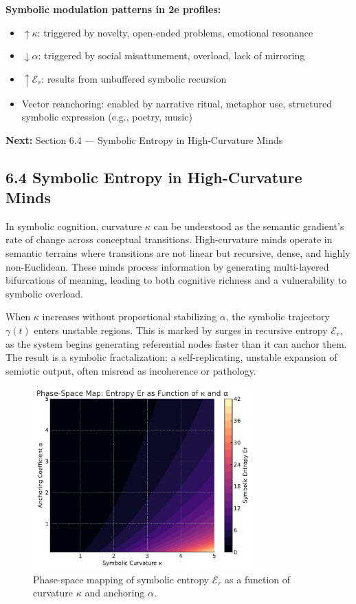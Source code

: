 \medskip
\noindent
\textbf{Symbolic modulation patterns in 2e profiles:}
\begin{itemize}[noitemsep]
    \item $\uparrow \kappa$: triggered by novelty, open-ended problems, emotional resonance
    \item $\downarrow \alpha$: triggered by social misattunement, overload, lack of mirroring
    \item $\uparrow \mathcal{E}_r$: results from unbuffered symbolic recursion
    \item Vector reanchoring: enabled by narrative ritual, metaphor use, structured symbolic expression (e.g., poetry, music)
\end{itemize}

\bigskip
\noindent
\textbf{Next:} Section 6.4 — Symbolic Entropy in High-Curvature Minds

\subsection*{6.4 Symbolic Entropy in High-Curvature Minds}

In symbolic cognition, curvature $\kappa$ can be understood as the semantic gradient's rate of change across conceptual transitions. High-curvature minds operate in semantic terrains where transitions are not linear but recursive, dense, and highly non-Euclidean. These minds process information by generating multi-layered bifurcations of meaning, leading to both cognitive richness and a vulnerability to symbolic overload.

When $\kappa$ increases without proportional stabilizing $\alpha$, the symbolic trajectory $\gamma(t)$ enters unstable regions. This is marked by surges in recursive entropy $\mathcal{E}_r$, as the system begins generating referential nodes faster than it can anchor them. The result is a symbolic fractalization: a self-replicating, unstable expansion of semiotic output, often misread as incoherence or pathology.

\begin{figure}[H]
\centering
\includegraphics[width=0.75\textwidth]{figs/entropy_kappa_map.pdf}
\caption{Phase-space mapping of symbolic entropy $\mathcal{E}_r$ as a function of curvature $\kappa$ and anchoring $\alpha$.}
\end{figure}

